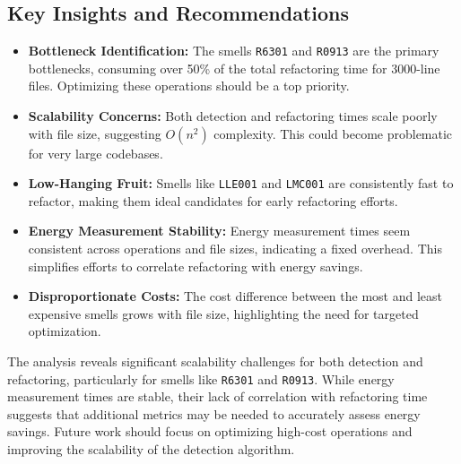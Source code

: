 \documentclass[12pt, titlepage]{article}
\begin{document}
\subsection*{Key Insights and Recommendations}
\begin{itemize}
    \item \textbf{Bottleneck Identification:} The smells \texttt{R6301} and \texttt{R0913} are the primary bottlenecks, consuming over 50\% of the total refactoring time for 3000-line files. Optimizing these operations should be a top priority.
    \item \textbf{Scalability Concerns:} Both detection and refactoring times scale poorly with file size, suggesting \(O(n^2)\) complexity. This could become problematic for very large codebases.
    \item \textbf{Low-Hanging Fruit:} Smells like \texttt{LLE001} and \texttt{LMC001} are consistently fast to refactor, making them ideal candidates for early refactoring efforts.
    \item \textbf{Energy Measurement Stability:} Energy measurement times seem consistent across operations and file sizes, indicating a fixed overhead. This simplifies efforts to correlate refactoring with energy savings.
    \item \textbf{Disproportionate Costs:} The cost difference between the most and least expensive smells grows with file size, highlighting the need for targeted optimization.
\end{itemize}

The analysis reveals significant scalability challenges for both detection and refactoring, particularly for smells like \texttt{R6301} and \texttt{R0913}. While energy measurement times are stable, their lack of correlation with refactoring time suggests that additional metrics may be needed to accurately assess energy savings. Future work should focus on optimizing high-cost operations and improving the scalability of the detection algorithm.
\end{document}
